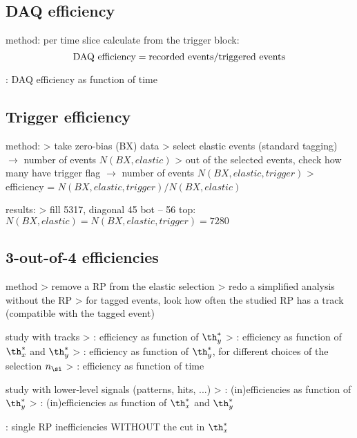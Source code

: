 \subsection{DAQ efficiency}

\> method: per time slice calculate from the trigger block:
$$\hbox{DAQ efficiency} = \hbox{recorded events} / \hbox{triggered events}$$

\> : DAQ efficiency as function of time

\subsection{Trigger efficiency}

\> method:
\>> take zero-bias (BX) data
\>> select elastic events (standard tagging) $\rightarrow$ number of events $N(BX,elastic)$
\>> out of the selected events, check how many have trigger flag $\rightarrow$ number of events $N(BX,elastic,trigger)$
\>> efficiency = $N(BX,elastic,trigger) / N(BX,elastic)$

\> results:
\>> fill 5317, diagonal 45 bot -- 56 top: $N(BX,elastic) = N(BX,elastic,trigger) = 7280$

\subsection{3-out-of-4 efficiencies}

\> method
\>> remove a RP from the elastic selection
\>> redo a simplified analysis without the RP
\>> for tagged events, look how often the studied RP has a track (compatible with the tagged event)

\> study with tracks
\>> : efficiency as function of $\th_y^*$
\>> : efficiency as function of $\th_x^*$ and $\th_y^*$
\>> : efficiency as function of $\th_y^*$, for different choices of the selection $n_\si$
\>> : efficiency as function of time

\> study with lower-level signals (patterns, hits, ...)
\>> : (in)efficiencies as function of $\th_y^*$
\>> : (in)efficiencies as function of $\th_x^*$ and $\th_y^*$




\iffalse
\>  : single RP inefficiencies WITHOUT the cut in $\th_x^*$

